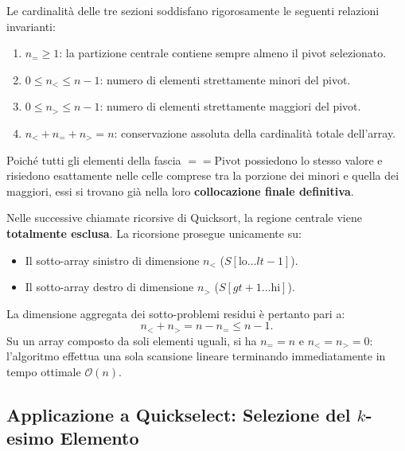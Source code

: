 \begin{property}
\label{prop:3way-dimensional-invariants}
Le cardinalità delle tre sezioni soddisfano rigorosamente le seguenti relazioni invarianti:
\begin{enumerate}
  \item $n_= \ge 1$: la partizione centrale contiene sempre almeno il pivot selezionato.
  \item $0 \le n_< \le n - 1$: numero di elementi strettamente minori del pivot.
  \item $0 \le n_> \le n - 1$: numero di elementi strettamente maggiori del pivot.
  \item $n_< + n_= + n_> = n$: conservazione assoluta della cardinalità totale dell'array.
\end{enumerate}
\end{property}

\begin{theorem}
\label{thm:central-region-exclusion}
Poiché tutti gli elementi della fascia $== \text{Pivot}$ possiedono lo stesso valore e risiedono esattamente nelle celle comprese tra la porzione dei minori e quella dei maggiori, essi si trovano già nella loro \textbf{collocazione finale definitiva}. 

Nelle successive chiamate ricorsive di Quicksort, la regione centrale viene \textbf{totalmente esclusa}. La ricorsione prosegue unicamente su:
\begin{itemize}
  \item Il sotto-array sinistro di dimensione $n_<$ ($S[\text{lo} \dots lt-1]$).
  \item Il sotto-array destro di dimensione $n_>$ ($S[gt+1 \dots \text{hi}]$).
\end{itemize}
La dimensione aggregata dei sotto-problemi residui è pertanto pari a:
\begin{equation}
  n_< + n_> = n - n_= \le n - 1.
\end{equation}
Su un array composto da soli elementi uguali, si ha $n_= = n$ e $n_< = n_> = 0$: l'algoritmo effettua una sola scansione lineare terminando immediatamente in tempo ottimale $\mathcal{O}(n)$.
\end{theorem}
\FloatBarrier

\subsection{Applicazione a Quickselect: Selezione del \texorpdfstring{$k$}{k}-esimo Elemento}
\label{subsec:3way-quickselect}

